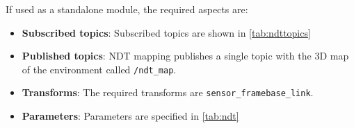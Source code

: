 If used as a standalone module, the required aspects are:
\begin{itemize}
  \item \textbf{Subscribed topics}: Subscribed topics are shown in \autoref{tab:ndttopics}
    \begin{table}[htb]
      \centering
      \caption{Autoware's NDT subscribed topics}
      \label{tab:ndttopics}
    \end{table}

  \item \textbf{Published topics}: NDT mapping publishes a single topic with the 3D map of the environment called \texttt{/ndt\_map}.

  \item \textbf{Transforms}: The required transforms are \texttt{sensor\_frame}\arrow\texttt{base\_link}. 

  \item \textbf{Parameters}: Parameters are specified in \autoref{tab:ndt}


\end{itemize}

